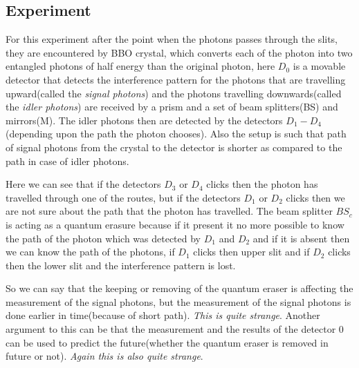     \subsection{Experiment}
    For this experiment after the point when the photons passes through the slits, they are encountered by BBO crystal, which converts each of the photon into two entangled photons of half energy than the original photon, here $D_0$ is a movable detector that detects the interference pattern for the photons that are travelling upward(called the \emph{signal photons}) and the photons travelling downwards(called the \emph{idler photons}) are received by a prism and a set of beam splitters(BS) and mirrors(M). The idler photons then are detected by the detectors $D_1 - D_4$(depending upon the path the photon chooses). Also the setup is such that path of signal photons from the crystal to the detector is shorter as compared to the path in case of idler photons. \\
    \par Here we can see that if the detectors $D_3$ or $D_4$ clicks then the photon has travelled through one of the routes, but if the detectors $D_1$ or $D_2$ clicks then we are not sure about the path that the photon has travelled. The beam splitter $BS_c$ is acting as a quantum erasure because if it present it no more possible to know the path of the photon which was detected by $D_1$ and $D_2$ and if it is absent then we can know the path of the photons, if $D_1$ clicks then upper slit and if $D_2$ clicks then the lower slit and the interference pattern is lost. \\
    \par So we can say that the keeping or removing of the quantum eraser is affecting the measurement of the signal photons, but the measurement of the signal photons is done earlier in time(because of short path). \emph{This is quite strange}. Another argument to this can be that the measurement and the results of the detector 0 can be used to predict the future(whether the quantum eraser is removed in future or not). \emph{Again this is also quite strange}.
